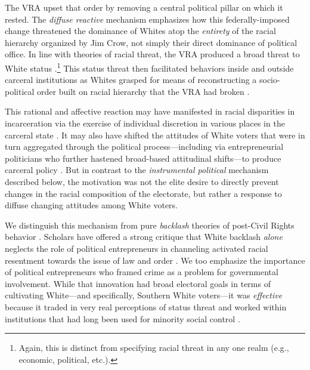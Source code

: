 \documentclass[12pt]{article}
\begin{document}
The VRA upset that order by removing a central political pillar on which it rested.  The \emph{diffuse reactive} mechanism emphasizes how this federally-imposed change threatened the dominance of Whites atop the \emph{entirety} of the racial hierarchy organized by Jim Crow, not simply their direct dominance of political office.  In line with theories of racial threat, the VRA produced a broad threat to White status \citep{Blumer:1958ue,Blalock:1967ud}.\footnote{Again, this is distinct from specifying racial threat in any one realm (e.g., economic, political, etc.). }  This status threat then facilitated behaviors inside and outside carceral institutions as Whites grasped for means of reconstructing a socio-political order built on racial hierarchy that the VRA had broken \citep{Kinder:1981ww,Kinder:2010wj,Banks:2012uz,Jardina:2019tk}.

This rational and affective reaction may have manifested in racial disparities in incarceration via the exercise of individual discretion in various places in the carceral state \citep[xix-xx]{UnitedStates:1982ty}. It may also have shifted the attitudes of White voters that were in turn aggregated through the political process---including via entrepreneurial politicians who further hastened broad-based attitudinal shifts---to produce carceral policy \citep{Weaver:2007vr,Campbell:2013tw,Enns:2015vz,Kuziemko:2015ts}. But in contrast to the \emph{instrumental political} mechanism described below, the motivation was not the elite desire to directly prevent changes in the racial composition of the electorate, but rather a response to diffuse changing attitudes among White voters.

We distinguish this mechanism from pure \emph{backlash} theories of post-Civil Rights behavior \citep{Edsall:1991ut}.  Scholars have offered a strong critique that White backlash \emph{alone} neglects the role of political entrepreneurs in channeling activated racial resentment towards the issue of law and order \citep{Weaver:2007vr,Lopez:2015vp}.  We too emphasize the importance of political entrepreneurs who framed crime as a problem for governmental involvement.  While that innovation had broad electoral goals in terms of cultivating White---and specifically, Southern White voters---it was \emph{effective} because it traded in very real perceptions of status threat and worked within institutions that had long been used for minority social control \citep{Muhammad:2011wf}.
\end{document}
